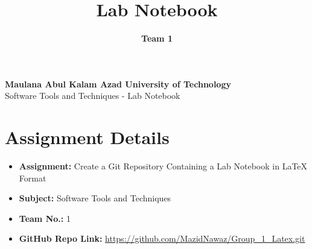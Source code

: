\documentclass[a4paper,12pt]{article}
\title{\textbf{Lab Notebook}}
\author{\textbf{Team 1}}
\date{}
\begin{document}
\maketitle

\begin{center}
    \Large\textbf{Maulana Abul Kalam Azad University of Technology}\\
    \vspace{0.2cm}
    \large Software Tools and Techniques - Lab Notebook
\end{center}

\vspace{1cm}

\section*{Assignment Details}
\begin{itemize}[leftmargin=1.5cm]
    \item \textbf{Assignment:} Create a Git Repository Containing a Lab Notebook in LaTeX Format
    \item \textbf{Subject:} Software Tools and Techniques
    \item \textbf{Team No.:} 1
    \item \textbf{GitHub Repo Link:} \url{https://github.com/MazidNawaz/Group_1_Latex.git}
\end{itemize}

\vspace{1cm}
\end{document}
